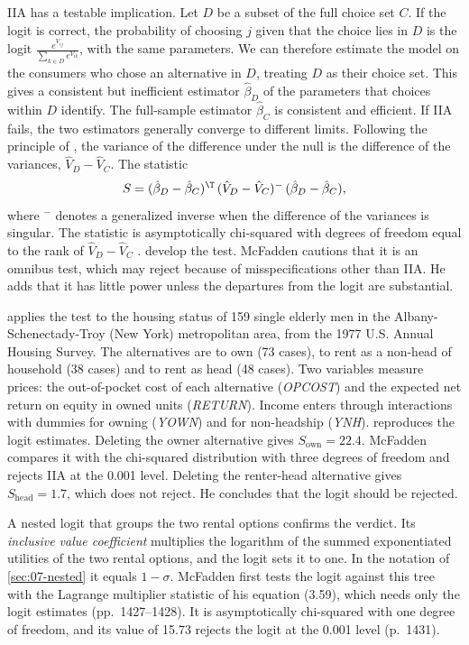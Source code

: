 IIA has a testable implication. Let $D$ be a subset of the full choice set $C$. If the logit is correct, the
probability of choosing $j$ given that the choice lies in $D$ is the logit $\frac{e^{V_{ij}}}{\sum_{k \in D}
e^{V_{ik}}}$, with the same parameters. We can therefore estimate the model on the consumers who chose an
alternative in $D$, treating $D$ as their choice set. This gives a consistent but inefficient estimator
$\hat\beta_D$ of the parameters that choices within $D$ identify. The full-sample estimator $\hat\beta_C$ is
consistent and efficient. If IIA fails,
the two estimators generally converge to different limits. Following the principle of \citet{Hausman1978},
the variance of the difference under the null is the difference of the variances, $\hat V_D - \hat V_C$. The
statistic
\begin{equation}\label{eq:07-hm-test}
  S = (\hat\beta_D - \hat\beta_C)^\T\,(\hat V_D - \hat V_C)^{-}\,(\hat\beta_D - \hat\beta_C),
\end{equation}
where $^{-}$ denotes a generalized inverse when the difference of the variances is singular. The statistic
is asymptotically chi-squared with degrees of freedom equal to the rank of $\hat V_D - \hat V_C$
\citep[pp.~1417--1418]{McFadden1984}. \citet{HausmanMcFadden1984} develop the test. McFadden cautions that it
is an omnibus test, which may reject because of misspecifications other than IIA. He adds that it has little
power unless the departures from the logit are substantial.

\citet[Section~3.11]{McFadden1984} applies the test to the housing status of 159 single elderly men in the
Albany-Schenectady-Troy (New York) metropolitan area, from the 1977 U.S. Annual Housing Survey. The
alternatives are to own (73 cases), to rent as a non-head of household (38 cases) and to rent as head (48
cases). Two variables measure prices: the out-of-pocket cost of each alternative (\textit{OPCOST}) and the
expected net return on equity in owned units (\textit{RETURN}). Income enters through interactions with dummies
for owning (\textit{YOWN}) and for non-headship (\textit{YNH}).  reproduces the logit
estimates. Deleting the owner alternative gives $S_{\text{own}} = 22.4$. McFadden compares it with the
chi-squared distribution with three degrees of freedom and rejects IIA at the 0.001 level. Deleting the
renter-head alternative gives $S_{\text{head}} = 1.7$, which does not reject. He concludes that the logit
should be rejected.

A nested logit that groups the two rental options confirms the verdict. Its \emph{inclusive value coefficient}
multiplies the logarithm of the summed exponentiated utilities of the two rental options, and the logit sets it
to one. In the notation of \cref{sec:07-nested} it equals $1 - \sigma$. McFadden first tests the logit against
this tree with the Lagrange multiplier statistic of his equation (3.59), which needs only the logit estimates
(pp.~1427--1428). It is asymptotically chi-squared with one degree of freedom, and its value of 15.73 rejects the
logit at the 0.001 level (p.~1431).


